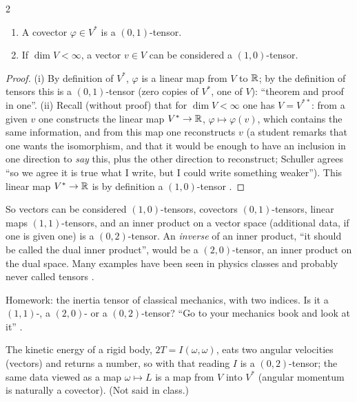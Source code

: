 \begin{paracol}{2}
\begin{theorem}\label{thm:c03-vec-tensors}
\begin{enumerate}
  \item A covector $\varphi\in V^*$ is a $(0,1)$-tensor.
  \item If $\dim V<\infty$, a vector $v\in V$ can be considered a $(1,0)$-tensor.
\end{enumerate}
\end{theorem}
\begin{proof}
(i) By definition of $V^*$, $\varphi$ is a linear map from $V$ to $\mathbb{R}$; by the definition of tensors this is a $(0,1)$-tensor (zero copies of $V^*$, one of $V$): ``theorem and proof in one''.
(ii) Recall (without proof) that for $\dim V<\infty$ one has $V=V^{**}$: from a given $v$ one constructs the linear map $V^*\to\mathbb{R}$, $\varphi\mapsto\varphi(v)$, which contains the same information, and from this map one reconstructs $v$ (a student remarks that one wants the isomorphism, and
that it would be enough to have an inclusion in one direction to \emph{say} this, plus the other direction to reconstruct; Schuller agrees ``so we agree it is true what I write, but I could write something weaker''). This linear map $V^*\to\mathbb{R}$ is by definition a $(1,0)$-tensor
.
\end{proof}
So vectors can be considered $(1,0)$-tensors, covectors $(0,1)$-tensors, linear maps $(1,1)$-tensors, and an inner product on a vector space (additional data, if one is given one) is a $(0,2)$-tensor. An \emph{inverse} of an inner product, ``it should be called the dual inner product'', would be a
$(2,0)$-tensor, an inner product on the dual space. Many examples have been seen in physics classes and probably never called tensors .

\begin{exercise}\label{ex:c03-inertia}
Homework: the inertia tensor of classical mechanics, with two indices. Is it a $(1,1)$-, a $(2,0)$- or a $(0,2)$-tensor? ``Go to your mechanics book and look at it'' .
\end{exercise}
\begin{coursenote}
The kinetic energy of a rigid body, $2T=I(\omega,\omega)$, eats two angular velocities (vectors) and returns a number, so with that reading $I$ is a $(0,2)$-tensor; the same data viewed as a map $\omega\mapsto L$ is a map from $V$ into $V^*$ (angular momentum is naturally a covector).
(Not said in class.)
\end{coursenote}


\end{paracol}
